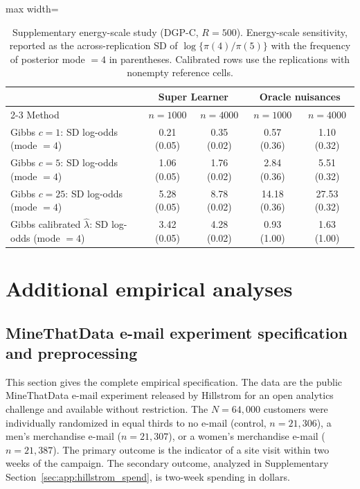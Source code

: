 \documentclass[11pt]{article}
\begin{document}
\begin{table}[t]
\centering
\caption{Supplementary energy-scale study (DGP-C, $R=500$). Energy-scale sensitivity, reported as the across-replication SD of $\log\{\pi(4)/\pi(5)\}$ with the frequency of posterior mode $=4$ in parentheses.  Calibrated rows use the replications with nonempty reference cells.}
\label{tab:sims:fragility_supp}
\begin{adjustbox}{max width=\textwidth}
\begin{tabular}{l cccc}
\toprule
& \multicolumn{2}{c}{Super Learner} & \multicolumn{2}{c}{Oracle nuisances}\\
\cmidrule{2-3}\cmidrule{4-5}
Method & $n=1000$ & $n=4000$ & $n=1000$ & $n=4000$\\
\midrule
Gibbs $c=1$: SD log-odds (mode $=4$) & 0.21 (0.05) & 0.35 (0.02) & 0.57 (0.36) & 1.10 (0.32)\\
Gibbs $c=5$: SD log-odds (mode $=4$) & 1.06 (0.05) & 1.76 (0.02) & 2.84 (0.36) & 5.51 (0.32)\\
Gibbs $c=25$: SD log-odds (mode $=4$) & 5.28 (0.05) & 8.78 (0.02) & 14.18 (0.36) & 27.53 (0.32)\\
Gibbs calibrated $\hat\lambda$: SD log-odds (mode $=4$) & 3.42 (0.05) & 4.28 (0.02) & 0.93 (1.00) & 1.63 (1.00)\\
\bottomrule
\end{tabular}
\end{adjustbox}
\end{table}

\section{Additional empirical analyses}\label{sec:app:additional_analysis}

\subsection{MineThatData e-mail experiment specification and preprocessing}\label{sec:app:hillstrom_spec}

This section gives the complete empirical specification. The data are the public MineThatData e-mail experiment released by Hillstrom \cite{hillstrom2008} for an open analytics challenge and available without restriction. The $N=64{,}000$ customers were individually randomized in equal thirds to no e-mail (control, $n=21{,}306$), a men's merchandise e-mail ($n=21{,}307$), or a women's merchandise e-mail ($n=21{,}387$). The primary outcome is the indicator of a site visit within two weeks of the campaign. The secondary outcome, analyzed in Supplementary Section~\ref{sec:app:hillstrom_spend}, is two-week spending in dollars.
\end{document}

